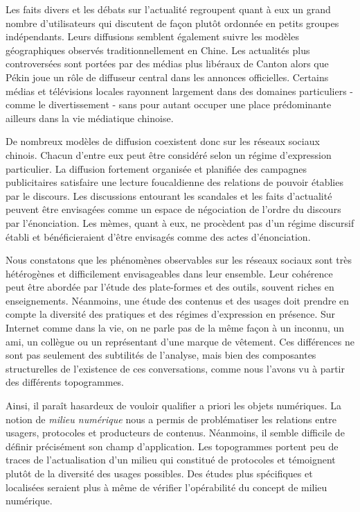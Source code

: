 Les faits divers et les débats sur l'actualité regroupent quant à eux un grand nombre d'utilisateurs qui discutent de façon plutôt ordonnée en petits groupes indépendants. Leurs diffusions semblent également suivre les modèles géographiques observés traditionnellement en Chine. Les actualités plus controversées sont portées par des médias plus libéraux de Canton alors que Pékin joue un rôle de diffuseur central dans les annonces officielles. Certains médias et télévisions locales rayonnent largement dans des domaines particuliers - comme le divertissement - sans pour autant occuper une place prédominante ailleurs dans la vie médiatique chinoise.

De nombreux modèles de diffusion coexistent donc sur les réseaux sociaux chinois. Chacun d'entre eux peut être considéré selon un régime d'expression particulier. La diffusion fortement organisée et planifiée des campagnes publicitaires satisfaire une lecture foucaldienne des relations de pouvoir établies par le discours. Les discussions entourant les scandales et les faits d'actualité peuvent être envisagées comme un espace de négociation de l'ordre du discours par l'énonciation. Les mèmes, quant à eux, ne procèdent pas d'un régime discursif établi et bénéficieraient d'être envisagés comme des actes d'énonciation. 

Nous constatons que les phénomènes observables sur les réseaux sociaux sont très hétérogènes et difficilement envisageables dans leur ensemble. Leur cohérence peut être abordée par l'étude des plate-formes et des outils, souvent riches en enseignements. Néanmoins, une étude des contenus et des usages doit prendre en compte la diversité des pratiques et des régimes d'expression en présence. Sur Internet comme dans la vie, on ne parle pas de la même façon à un inconnu, un ami, un collègue ou un représentant d'une marque de vêtement. Ces différences ne sont pas seulement des subtilités de l'analyse, mais bien des composantes structurelles de l'existence de ces conversations, comme nous l'avons vu à partir des différents topogrammes.

Ainsi, il paraît hasardeux de vouloir qualifier a priori les objets numériques. La notion de \textit{milieu numérique} nous a permis de problématiser les relations entre usagers, protocoles et producteurs de contenus. Néanmoins, il semble difficile de définir précisément son champ d'application. Les topogrammes portent peu de traces de l'actualisation d'un milieu qui constitué de protocoles et témoignent plutôt de la diversité des usages possibles. Des études plus spécifiques et localisées seraient plus à même de vérifier l'opérabilité du concept de milieu numérique. 



